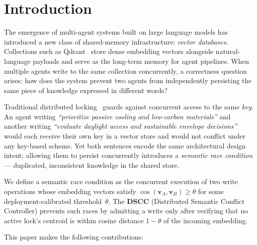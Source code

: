 \documentclass[sigconf]{acmart}
\begin{document}
\section{Introduction}
\label{sec:intro}

The emergence of multi-agent systems built on large language models has introduced a new
class of shared-memory infrastructure: \emph{vector databases}. Collections such as
Qdrant~\cite{qdrant} store dense embedding vectors alongside natural-language payloads
and serve as the long-term memory for agent pipelines. When multiple agents write to the
same collection concurrently, a correctness question arises: how does the system prevent
two agents from independently persisting the same piece of knowledge expressed in
different words?

Traditional distributed locking~\cite{chubby, zookeeper} guards against concurrent
access to the same \emph{key}. An agent writing \emph{``prioritize passive cooling and
low-carbon materials''} and another writing \emph{``evaluate daylight access and
sustainable envelope decisions''} would each receive their own key in a vector store and
would not conflict under any key-based scheme. Yet both sentences encode the same
architectural design intent; allowing them to persist concurrently introduces a
\emph{semantic race condition} — duplicated, inconsistent knowledge in the shared store.

We define a semantic race condition as the concurrent execution of two write operations
whose embedding vectors satisfy $\cos(\mathbf{v}_A, \mathbf{v}_B) \geq \theta$ for
some deployment-calibrated threshold~$\theta$. The \textbf{DSCC} (Distributed Semantic
Conflict Controller) prevents such races by admitting a write only after verifying that
no active lock's centroid is within cosine distance $1{-}\theta$ of the incoming
embedding.

This paper makes the following contributions:
\end{document}
